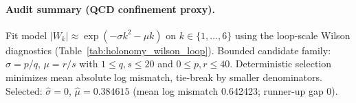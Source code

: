\paragraph{Audit summary (QCD confinement proxy).} \AuditTag Fit model $|W_k|\approx \exp(-\sigma k^2-\mu k)$ on $k\in\{1,\dots,6\}$ using the loop-scale Wilson diagnostics (Table~\ref{tab:holonomy_wilson_loop}). Bounded candidate family: $\sigma=p/q$, $\mu=r/s$ with $1\le q,s\le 20$ and $0\le p,r\le 40$. Deterministic selection minimizes mean absolute log mismatch, tie-break by smaller denominators. Selected: $\widehat\sigma=0$, $\widehat\mu=0.384615$ (mean log mismatch 0.642423; runner-up gap 0).
